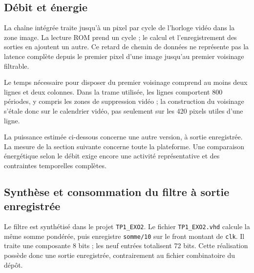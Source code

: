 \documentclass[11pt,a4paper]{article}
\begin{document}
\begin{center}
\end{center}

\subsection{Débit et énergie}
La chaîne intégrée traite jusqu'à un pixel par cycle de l'horloge vidéo dans la zone image. La lecture ROM prend un cycle ; le calcul et l'enregistrement des sorties en ajoutent un autre. Ce retard de chemin de données ne représente pas la latence complète depuis le premier pixel d'une image jusqu'au premier voisinage filtrable.

Le temps nécessaire pour disposer du premier voisinage comprend au moins deux lignes et deux colonnes. Dans la trame utilisée, les lignes comportent 800 périodes, y compris les zones de suppression vidéo ; la construction du voisinage s'étale donc sur le calendrier vidéo, pas seulement sur les 420 pixels utiles d'une ligne.

La puissance estimée ci-dessous concerne une autre version, à sortie enregistrée. La mesure de la section suivante concerne toute la plateforme. Une comparaison énergétique selon le débit exige encore une activité représentative et des contraintes temporelles complètes.

\newpage
\subsection{Synthèse et consommation du filtre à sortie enregistrée}
Le filtre est synthétisé dans le projet \texttt{TP1\_EXO2}. Le fichier \texttt{TP1\_EXO2.vhd} calcule la même somme pondérée, puis enregistre \texttt{somme/10} sur le front montant de \texttt{clk}. Il traite une composante 8 bits ; les neuf entrées totalisent 72 bits. Cette réalisation possède donc une sortie enregistrée, contrairement au fichier combinatoire du dépôt.
\end{document}

